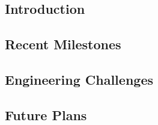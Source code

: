 \subsection{Introduction}
\subsection{Recent Milestones}
\subsection{Engineering Challenges}
\subsection{Future Plans}

